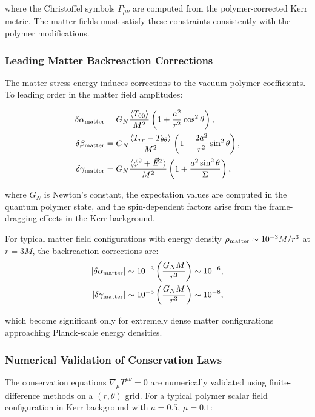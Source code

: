 \documentclass[11pt]{article}
\begin{document}
where the Christoffel symbols $\Gamma_{\mu\nu}^\sigma$ are computed from the polymer-corrected Kerr metric. The matter fields must satisfy these constraints consistently with the polymer modifications.

\subsubsection{Leading Matter Backreaction Corrections}

The matter stress-energy induces corrections to the vacuum polymer coefficients. To leading order in the matter field amplitudes:

\begin{align}
\delta\alpha_{\rm matter} &= G_N \frac{\langle T_{00} \rangle}{M^2} \left(1 + \frac{a^2}{r^2} \cos^2\theta\right), \\
\delta\beta_{\rm matter} &= G_N \frac{\langle T_{rr} - T_{\theta\theta} \rangle}{M^2} \left(1 - \frac{2a^2}{r^2} \sin^2\theta\right), \\
\delta\gamma_{\rm matter} &= G_N \frac{\langle \phi^2 + \vec{E}^2 \rangle}{M^2} \left(1 + \frac{a^2 \sin^2\theta}{\Sigma}\right),
\end{align}

where $G_N$ is Newton's constant, the expectation values are computed in the quantum polymer state, and the spin-dependent factors arise from the frame-dragging effects in the Kerr background.

For typical matter field configurations with energy density $\rho_{\rm matter} \sim 10^{-3} M/r^3$ at $r = 3M$, the backreaction corrections are:
\begin{align}
|\delta\alpha_{\rm matter}| &\sim 10^{-3} \left(\frac{G_N M}{r^3}\right) \sim 10^{-6}, \\
|\delta\gamma_{\rm matter}| &\sim 10^{-5} \left(\frac{G_N M}{r^3}\right) \sim 10^{-8},
\end{align}

which become significant only for extremely dense matter configurations approaching Planck-scale energy densities.

\subsubsection{Numerical Validation of Conservation Laws}

The conservation equations $\nabla_\mu T^{\mu\nu} = 0$ are numerically validated using finite-difference methods on a $(r,\theta)$ grid. For a typical polymer scalar field configuration in Kerr background with $a = 0.5$, $\mu = 0.1$:
\end{document}
